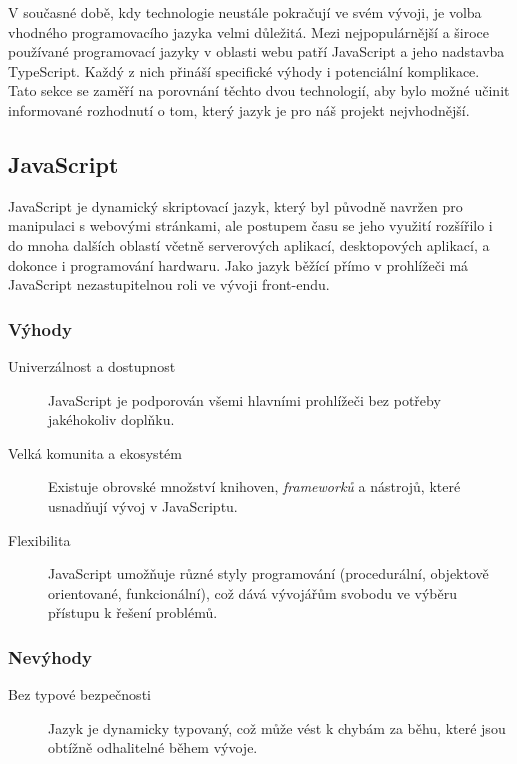 V současné době, kdy technologie neustále pokračují ve svém vývoji, je volba vhodného programovacího jazyka velmi důležitá. Mezi nejpopulárnější a široce používané programovací jazyky v oblasti webu patří JavaScript a jeho nadstavba TypeScript. Každý z nich přináší specifické výhody i potenciální komplikace. Tato sekce se zaměří na porovnání těchto dvou technologií, aby bylo možné učinit informované rozhodnutí o tom, který jazyk je pro náš projekt nejvhodnější.

\subsection{JavaScript}
JavaScript je dynamický skriptovací jazyk, který byl původně navržen pro manipulaci s webovými stránkami, ale postupem času se jeho využití rozšířilo i do mnoha dalších oblastí včetně serverových aplikací, desktopových aplikací, a dokonce i programování hardwaru. Jako jazyk běžící přímo v prohlížeči má JavaScript nezastupitelnou roli ve vývoji front-endu. \cite{JavaScript}

\subsubsection{Výhody}

\begin{description}
    \item[Univerzálnost a dostupnost] JavaScript je podporován všemi hlavními prohlížeči bez potřeby jakéhokoliv doplňku.
    \item[Velká komunita a ekosystém] Existuje obrovské množství knihoven, \emph{frameworků} a nástrojů, které usnadňují vývoj v JavaScriptu.
    \item[Flexibilita] JavaScript umožňuje různé styly programování (procedurální, objektově orientované, funkcionální), což dává vývojářům svobodu ve výběru přístupu k řešení problémů.
\end{description}

\subsubsection{Nevýhody}

\begin{description}
    \item[Bez typové bezpečnosti] Jazyk je dynamicky typovaný, což může vést k chybám za běhu, které jsou obtížně odhalitelné během vývoje.
\end{description}

